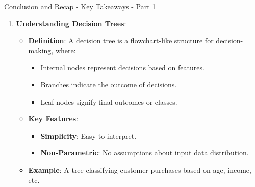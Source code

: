 \documentclass[aspectratio=169]{beamer}
\begin{document}
\begin{frame}[fragile]{Conclusion and Recap - Key Takeaways - Part 1}
    \begin{enumerate}
        \item \textbf{Understanding Decision Trees}:
        \begin{itemize}
            \item \textbf{Definition}: A decision tree is a flowchart-like structure for decision-making, where:
            \begin{itemize}
                \item Internal nodes represent decisions based on features.
                \item Branches indicate the outcome of decisions.
                \item Leaf nodes signify final outcomes or classes.
            \end{itemize}
            \item \textbf{Key Features}:
            \begin{itemize}
                \item \textbf{Simplicity}: Easy to interpret.
                \item \textbf{Non-Parametric}: No assumptions about input data distribution.
            \end{itemize}
            \item \textbf{Example}: A tree classifying customer purchases based on age, income, etc.
        \end{itemize}
    \end{enumerate}
\end{frame}
\end{document}
